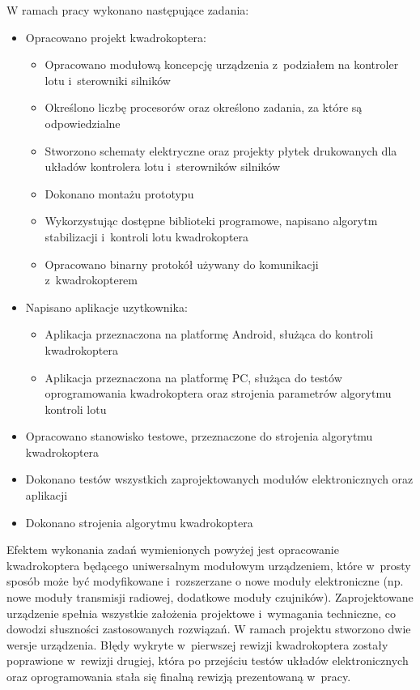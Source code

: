 \documentclass[11pt, twoside]{Thesis} %
\begin{document}
W ramach pracy wykonano następujące zadania:
\begin{itemize}
	\item Opracowano projekt kwadrokoptera:
	\begin{itemize}
		\item Opracowano modułową koncepcję urządzenia z~podziałem na kontroler lotu i~sterowniki silników
		\item Określono liczbę procesorów oraz określono zadania, za które są odpowiedzialne
		\item Stworzono schematy elektryczne oraz projekty płytek drukowanych dla układów kontrolera lotu i~sterowników silników
		\item Dokonano montażu prototypu
		\item Wykorzystując dostępne biblioteki programowe, napisano algorytm stabilizacji i~kontroli lotu kwadrokoptera
		\item Opracowano binarny protokół używany do komunikacji z~kwadrokopterem
	\end{itemize}
	\item Napisano aplikacje uzytkownika:
	\begin{itemize}
		\item Aplikacja przeznaczona na platformę Android, służąca do kontroli kwadrokoptera
		\item Aplikacja przeznaczona na platformę PC, służąca do testów oprogramowania kwadrokoptera oraz strojenia parametrów algorytmu kontroli lotu
	\end{itemize}
	\item Opracowano stanowisko testowe, przeznaczone do strojenia algorytmu kwadrokoptera	
	\item Dokonano testów wszystkich zaprojektowanych modułów elektronicznych oraz aplikacji
	\item Dokonano strojenia algorytmu kwadrokoptera
\end{itemize}

Efektem wykonania zadań wymienionych powyżej jest opracowanie kwadrokoptera będącego uniwersalnym modułowym urządzeniem, które w~prosty sposób może być modyfikowane i~rozszerzane o nowe moduły elektroniczne (np. nowe moduły transmisji radiowej, dodatkowe moduły czujników). 
Zaprojektowane urządzenie spełnia wszystkie założenia projektowe i~wymagania techniczne, co dowodzi słuszności zastosowanych rozwiązań.
W ramach projektu stworzono dwie wersje urządzenia. Błędy wykryte w~pierwszej rewizji kwadrokoptera zostały poprawione w~rewizji drugiej, która po przejściu testów układów elektronicznych oraz oprogramowania stała się finalną rewizją prezentowaną w~pracy. 
\end{document}
